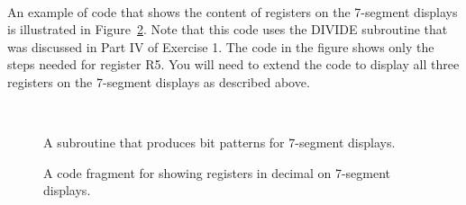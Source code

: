 \documentclass[epsfig,10pt,fullpage]{article}
\newcommand{\CommonDocsPath}{../../../../common/docs}
\begin{document}
~\\
\noindent
An example of code that shows the content of registers on the 7-segment displays
is illustrated in Figure~\ref{fig:codefrag}. Note that this code uses the DIVIDE subroutine that 
was discussed in Part IV of Exercise 1.  The code in the figure shows only the steps needed 
for register R5.  You will need to extend the code to display all three registers on the 7-segment
displays as described above.

~\\
\begin{figure}[H]
\begin{center}

\end{center}
\caption{A subroutine that produces bit patterns for 7-segment displays.}
\label{fig:code7}
\end{figure}

\begin{figure}[H]
\begin{center}

\end{center}
\caption{A code fragment for showing registers in decimal on 7-segment displays.}
\label{fig:codefrag}
\end{figure}



\end{document}
